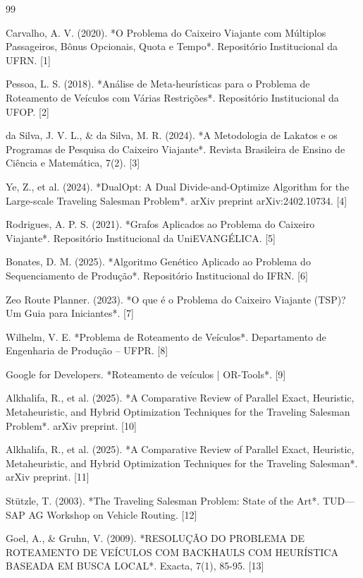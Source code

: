 \documentclass[11pt,a4paper,twocolumn]{article}
\begin{document}
\begin{thebibliography}{99}

Carvalho, A. V. (2020). *O Problema do Caixeiro Viajante com Múltiplos Passageiros, Bônus Opcionais, Quota e Tempo*. Repositório Institucional da UFRN. [1]

Pessoa, L. S. (2018). *Análise de Meta-heurísticas para o Problema de Roteamento de Veículos com Várias Restrições*. Repositório Institucional da UFOP. [2]

da Silva, J. V. L., & da Silva, M. R. (2024). *A Metodologia de Lakatos e os Programas de Pesquisa do Caixeiro Viajante*. Revista Brasileira de Ensino de Ciência e Matemática, 7(2). [3]

Ye, Z., et al. (2024). *DualOpt: A Dual Divide-and-Optimize Algorithm for the Large-scale Traveling Salesman Problem*. arXiv preprint arXiv:2402.10734. [4]

Rodrigues, A. P. S. (2021). *Grafos Aplicados ao Problema do Caixeiro Viajante*. Repositório Institucional da UniEVANGÉLICA. [5]

Bonates, D. M. (2025). *Algoritmo Genético Aplicado ao Problema do Sequenciamento de Produção*. Repositório Institucional do IFRN. [6]

Zeo Route Planner. (2023). *O que é o Problema do Caixeiro Viajante (TSP)? Um Guia para Iniciantes*. [7]

Wilhelm, V. E. *Problema de Roteamento de Veículos*. Departamento de Engenharia de Produção – UFPR. [8]

Google for Developers. *Roteamento de veículos | OR-Tools*. [9]

Alkhalifa, R., et al. (2025). *A Comparative Review of Parallel Exact, Heuristic, Metaheuristic, and Hybrid Optimization Techniques for the Traveling Salesman Problem*. arXiv preprint. [10]

Alkhalifa, R., et al. (2025). *A Comparative Review of Parallel Exact, Heuristic, Metaheuristic, and Hybrid Optimization Techniques for the Traveling Salesman*. arXiv preprint. [11]

Stützle, T. (2003). *The Traveling Salesman Problem: State of the Art*. TUD— SAP AG Workshop on Vehicle Routing. [12]

Goel, A., & Gruhn, V. (2009). *RESOLUÇÃO DO PROBLEMA DE ROTEAMENTO DE VEÍCULOS COM BACKHAULS COM HEURÍSTICA BASEADA EM BUSCA LOCAL*. Exacta, 7(1), 85-95. [13]


\end{thebibliography}
\end{document}
